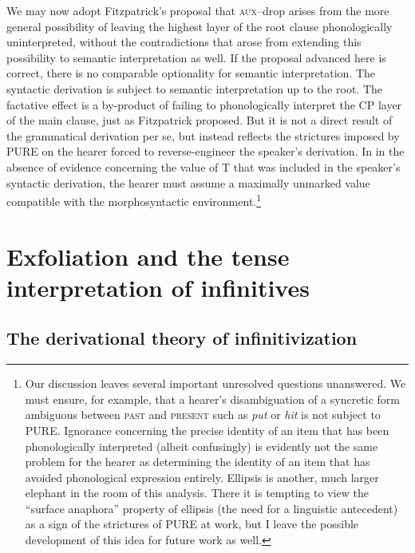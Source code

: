 \documentclass[output=paper]{langscibook}
\begin{document}
We may now adopt Fitzpatrick's proposal that \textsc{aux}--drop arises from the more general possibility of leaving the highest layer of the root clause phonologically uninterpreted, without the contradictions that arose from extending this possibility to semantic interpretation as well. If the proposal advanced here is correct, there is no comparable optionality for semantic interpretation. The syntactic derivation is subject to semantic interpretation up to the root. The factative effect is a by-product of failing to phonologically interpret the CP layer of the main clause, just as Fitzpatrick proposed. But it is not a direct result of the grammatical derivation per se, but instead reflects the strictures imposed by PURE on the hearer forced to reverse-engineer the speaker's derivation. In in the absence of evidence concerning the value of T that was included in the speaker's syntactic derivation, the hearer must assume a maximally unmarked value compatible with the morphosyntactic environment.\footnote{Our discussion leaves several important unresolved questions unanswered. We must ensure, for example, that a hearer's disambiguation of a syncretic form ambiguous between \textsc{past }and \textsc{present} such as \textit{put} or \textit{hit }is not subject to PURE. Ignorance concerning the precise identity of an item that has been phonologically interpreted (albeit confusingly) is evidently not the same problem for the hearer as determining the identity of an item that has avoided phonological expression entirely. Ellipsis is another, much larger elephant in the room of this analysis. There it is tempting to view the “surface anaphora” property of ellipsis (the need for a linguistic antecedent) as a sign of the strictures of PURE at work, but I leave the possible development of this idea for future work as well.}

\section{Exfoliation and the tense interpretation of infinitives}

\subsection{The derivational theory of infinitivization}
\end{document}
